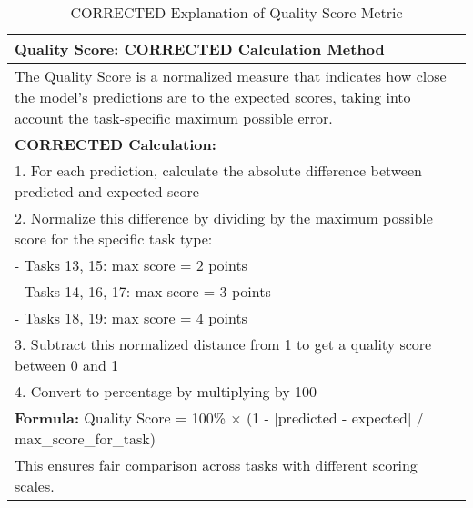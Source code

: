 \documentclass{article}
\begin{document}
\begin{table}[htbp]
\centering
\caption{CORRECTED Explanation of Quality Score Metric}
\label{tab:quality_score_explanation}
\begin{tabular}{p{12cm}}
\toprule
\textbf{Quality Score: CORRECTED Calculation Method} \\
\midrule
The Quality Score is a normalized measure that indicates how close the model's predictions are to the expected scores, taking into account the task-specific maximum possible error. \\
\addlinespace
\textbf{CORRECTED Calculation:} \\
1. For each prediction, calculate the absolute difference between predicted and expected score \\
2. Normalize this difference by dividing by the maximum possible score for the specific task type: \\
   - Tasks 13, 15: max score = 2 points \\
   - Tasks 14, 16, 17: max score = 3 points \\
   - Tasks 18, 19: max score = 4 points \\
3. Subtract this normalized distance from 1 to get a quality score between 0 and 1 \\
4. Convert to percentage by multiplying by 100 \\
\addlinespace
\textbf{Formula:} Quality Score = 100\% × (1 - |predicted - expected| / max\_score\_for\_task) \\
\addlinespace
This ensures fair comparison across tasks with different scoring scales. \\
\bottomrule
\end{tabular}
\end{table}
\end{document}
